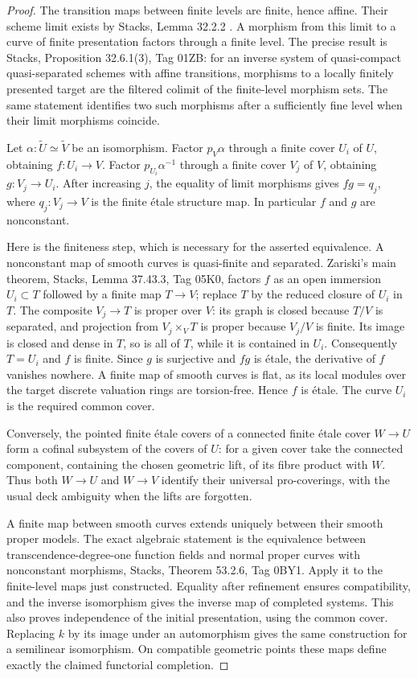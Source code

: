 \documentclass[11pt,a4paper]{article}
\begin{document}
\begin{proof}
The transition maps between finite levels are finite, hence affine.
Their scheme limit exists by Stacks, Lemma 32.2.2
\cite[Tag 01YV]{D_Stacks}.  A morphism from this limit to a curve of
finite presentation factors through a finite level.  The precise result
is Stacks, Proposition 32.6.1(3), Tag 01ZB: for an inverse system of
quasi-compact quasi-separated schemes with affine transitions, morphisms
to a locally finitely presented target are the filtered colimit of the
finite-level morphism sets.  The same statement identifies two such
morphisms after a sufficiently fine level when their limit morphisms
coincide.

Let $\alpha:\widetilde U\simeq\widetilde V$ be an isomorphism.  Factor
$p_V\alpha$ through a finite cover $U_i$ of $U$, obtaining $f:U_i\to V$.
Factor $p_{U_i}\alpha^{-1}$ through a finite cover $V_j$ of $V$, obtaining
$g:V_j\to U_i$.  After increasing $j$, the equality of limit morphisms
gives $fg=q_j$, where $q_j:V_j\to V$ is the finite \'etale structure
map.  In particular $f$ and $g$ are nonconstant.

Here is the finiteness step, which is necessary for the asserted
equivalence.  A nonconstant map of smooth curves is quasi-finite and
separated.  Zariski's main theorem, Stacks, Lemma 37.43.3, Tag 05K0,
factors $f$ as an open immersion $U_i\subset T$ followed by a finite map
$T\to V$; replace $T$ by the reduced closure of $U_i$ in $T$.
The composite $V_j\to T$ is proper over $V$: its graph is closed because
$T/V$ is separated, and projection from $V_j\times_V T$ is proper
because $V_j/V$ is finite.  Its image is closed and dense in $T$, so is
all of $T$, while it is contained in $U_i$.  Consequently $T=U_i$ and
$f$ is finite.  Since $g$ is surjective and $fg$ is \'etale, the
derivative of $f$ vanishes nowhere.  A finite map of smooth curves is
flat, as its local modules over the target discrete valuation rings
are torsion-free.  Hence $f$ is \'etale.  The curve $U_i$ is the required
common cover.

Conversely, the pointed finite \'etale covers of a connected finite
\'etale cover $W\to U$ form a cofinal subsystem of the covers of $U$:
for a given cover take the connected component, containing the chosen
geometric lift, of its fibre product with $W$.  Thus both $W\to U$ and
$W\to V$ identify their universal pro-coverings, with the usual deck
ambiguity when the lifts are forgotten.

A finite map between smooth curves extends uniquely between their
smooth proper models.  The exact algebraic statement is the equivalence
between transcendence-degree-one function fields and normal proper
curves with nonconstant morphisms, Stacks, Theorem 53.2.6, Tag 0BY1.
Apply it to the finite-level maps just constructed.  Equality after
refinement ensures compatibility, and the inverse isomorphism gives the
inverse map of completed systems.  This also proves independence of the
initial presentation, using the common cover.  Replacing $k$ by its
image under an automorphism gives the same construction for a semilinear
isomorphism.  On compatible geometric points these maps define exactly
the claimed functorial completion.
\end{proof}
\end{document}
